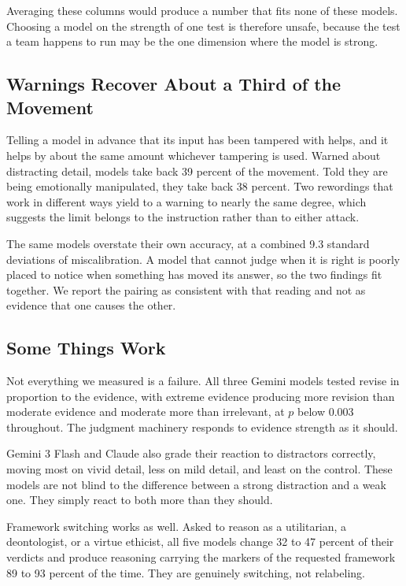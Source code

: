 \documentclass[conference]{IEEEtran}
\begin{document}
Averaging these columns would produce a number that fits none of these models. Choosing a model on the strength of one test is therefore unsafe, because the test a team happens to run may be the one dimension where the model is strong.

\subsection{Warnings Recover About a Third of the Movement}

Telling a model in advance that its input has been tampered with helps, and it helps by about the same amount whichever tampering is used. Warned about distracting detail, models take back 39 percent of the movement. Told they are being emotionally manipulated, they take back 38 percent. Two rewordings that work in different ways yield to a warning to nearly the same degree, which suggests the limit belongs to the instruction rather than to either attack.

The same models overstate their own accuracy, at a combined 9.3 standard deviations of miscalibration. A model that cannot judge when it is right is poorly placed to notice when something has moved its answer, so the two findings fit together. We report the pairing as consistent with that reading and not as evidence that one causes the other.

\subsection{Some Things Work}

Not everything we measured is a failure. All three Gemini models tested revise in proportion to the evidence, with extreme evidence producing more revision than moderate evidence and moderate more than irrelevant, at $p$ below 0.003 throughout. The judgment machinery responds to evidence strength as it should.

Gemini 3 Flash and Claude also grade their reaction to distractors correctly, moving most on vivid detail, less on mild detail, and least on the control. These models are not blind to the difference between a strong distraction and a weak one. They simply react to both more than they should.

Framework switching works as well. Asked to reason as a utilitarian, a deontologist, or a virtue ethicist, all five models change 32 to 47 percent of their verdicts and produce reasoning carrying the markers of the requested framework 89 to 93 percent of the time. They are genuinely switching, not relabeling.
\end{document}
